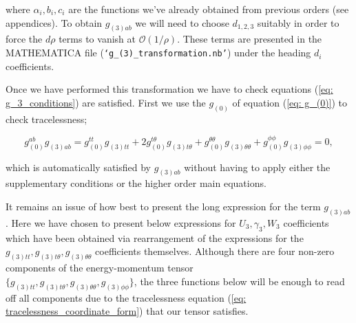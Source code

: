 \documentclass[a4paper,11pt]{article}
\numberwithin{equation}{section}
\begin{document}
\noindent where $\alpha_i, b_i, c_i$ are the functions we've already obtained from previous orders (see appendices).  To obtain $g_{(3)ab}$ we will need to choose $d_{1,2,3}$ suitably in order to force the $d\rho$ terms to vanish at $\mathcal{O}(1/\rho)$. These terms are presented in the MATHEMATICA file (\texttt{`g\_(3)\_transformation.nb'}) under the heading $d_i$ coefficients. \par

Once we have performed this transformation we have to check equations (\ref{eq: g_3_conditions}) are satisfied. First we use the $g_{(0)}$ of equation (\ref{eq: g_(0)}) to check tracelessness;

\begin{equation} \label{eq: tracelessness_coordinate_form}
g_{(0)}^{ab}g_{(3)ab}=g_{(0)}^{tt}g_{(3)tt}+2g_{(0)}^{t\theta}g_{(3)t\theta}+g_{(0)}^{\theta \theta}g_{(3)\theta \theta}+g_{(0)}^{\phi \phi}g_{(3)\phi \phi}=0,
\end{equation} 

\noindent which is automatically satisfied by $g_{(3)ab}$ without having to apply either the supplementary conditions or the higher order main equations. \par 

It remains an issue of how best to present the long expression for the term $g_{(3) ab}$. Here we have chosen to present below expressions for $U_3, \gamma_3, W_3$ coefficients which have been obtained via rearrangement of the expressions for the $g_{(3)tt}, g_{(3)t\theta}, g_{(3) \theta \theta}$ coefficients themselves. Although there are four non-zero components of the energy-momentum tensor \\
$\{g_{(3)tt}, g_{(3)t\theta}, g_{(3) \theta \theta}, g_{(3)\phi \phi}\}$, the three functions below will be enough to read off all components due to the tracelessness equation (\ref{eq: tracelessness_coordinate_form})  that our tensor satisfies. 
\end{document}
